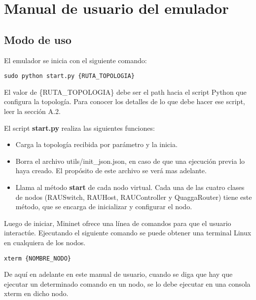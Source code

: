 
\chapter{Manual de usuario del emulador}

\section{Modo de uso}
El emulador se inicia con el siguiente comando:
\begin{lstlisting}
sudo python start.py {RUTA_TOPOLOGIA}
\end{lstlisting}

El valor de \{RUTA\_TOPOLOGIA\} debe ser el path hacia el script Python que configura la topología. Para conocer los detalles de lo que debe hacer ese script, leer la sección A.2.

El script \textbf{start.py} realiza las siguientes funciones:
\begin{itemize}
	\item Carga la topología recibida por parámetro y la inicia.
	\item Borra el archivo utils/init\_json.json, en caso de que una ejecución previa lo haya creado. El propósito de este archivo se verá mas adelante.
	\item Llama al método \textbf{start} de cada nodo virtual. Cada una de las cuatro clases de nodos (RAUSwitch, RAUHost, RAUController y QuaggaRouter) tiene este método, que se encarga de inicializar y configurar el nodo.
\end{itemize}

Luego de iniciar, Mininet ofrece una línea de comandos para que el usuario interactúe. Ejecutando el siguiente comando se puede obtener una terminal Linux en cualquiera de los nodos.
\begin{lstlisting}
xterm {NOMBRE_NODO}
\end{lstlisting}

De aquí en adelante en este manual de usuario, cuando se diga que hay que ejecutar un determinado comando en un nodo, se lo debe ejecutar en una consola xterm en dicho nodo.

